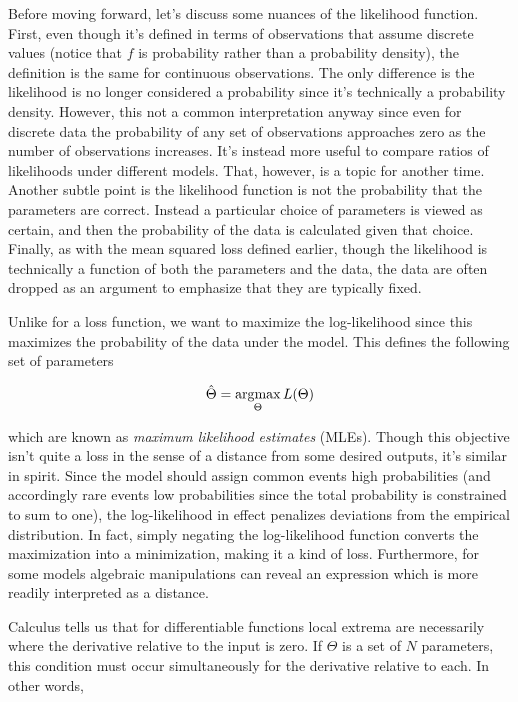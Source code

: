 Before moving forward, let's discuss some nuances of the likelihood function. First, even though it's defined in terms of observations that assume discrete values (notice that $f$ is probability rather than a probability density), the definition is the same for continuous observations. The only difference is the likelihood is no longer considered a probability since it's technically a probability density. However, this not a common interpretation anyway since even for discrete data the probability of any set of observations approaches zero as the number of observations increases. It's instead more useful to compare ratios of likelihoods under different models. That, however, is a topic for another time. Another subtle point is the likelihood function is not the probability that the parameters are correct. Instead a particular choice of parameters is viewed as certain, and then the probability of the data is calculated given that choice. Finally, as with the mean squared loss defined earlier, though the likelihood is technically a function of both the parameters and the data, the data are often dropped as an argument to emphasize that they are typically fixed.

Unlike for a loss function, we want to maximize the log-likelihood since this maximizes the probability of the data under the model. This defines the following set of parameters

\begin{equation*}
\hat{\Theta} = \operatorname*{arg\!\max}_\Theta L(\Theta)
\end{equation*}

which are known as \textit{maximum likelihood estimates} (MLEs). Though this objective isn't quite a loss in the sense of a distance from some desired outputs, it's similar in spirit. Since the model should assign common events high probabilities (and accordingly rare events low probabilities since the total probability is constrained to sum to one), the log-likelihood in effect penalizes deviations from the empirical distribution. In fact, simply negating the log-likelihood function converts the maximization into a minimization, making it a kind of loss. Furthermore, for some models algebraic manipulations can reveal an expression which is more readily interpreted as a distance.

Calculus tells us that for differentiable functions local extrema are necessarily where the derivative relative to the input is zero. If $\Theta$ is a set of $N$ parameters, this condition must occur simultaneously for the derivative relative to each. In other words,


